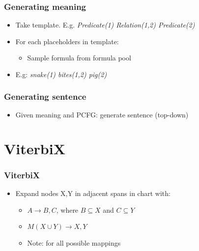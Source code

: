 \documentclass[11pt,a4paper,xcolor=dvipsnames]{beamer}
\begin{document}
\begin{frame}
\frametitle{Generating meaning}
\begin{itemize}
  \item Take template. E.g. \textit{ Predicate(1) Relation(1,2) Predicate(2) }
  \item For each placeholders in template:
  \begin{itemize}
    \item Sample formula from formula pool
  \end{itemize}
  \item E.g: \textit{ snake(1) bites(1,2) pig(2) }
\end{itemize}
\end{frame}

\begin{frame}
\frametitle{Generating sentence}
\begin{itemize}
  \item Given meaning and PCFG: generate sentence (top-down)
\end{itemize}
\end{frame}

\section{ViterbiX} %
\begin{frame} 
\frametitle{ViterbiX}
\begin{itemize}
  \item Expand nodes X,Y in adjacent spans in chart with:
  \begin{itemize}
    \item $A \rightarrow B,C$, where $B \subseteq X$ and $C \subseteq Y$
    \item $M(X \cup Y) \rightarrow X,Y$
    \item Note: for all possible mappings
  \end{itemize}
\end{itemize}
\end{frame}
\end{document}
